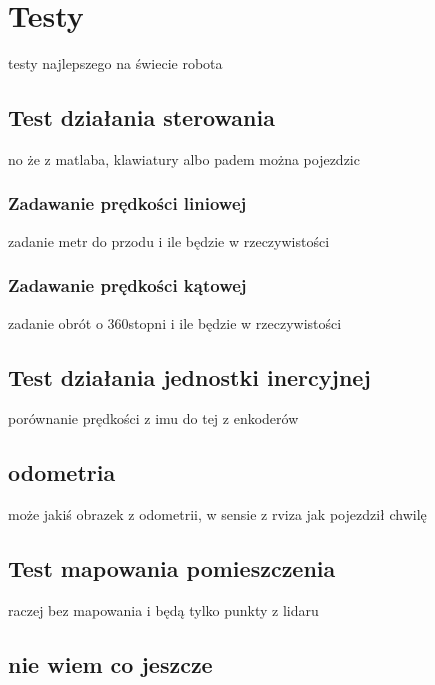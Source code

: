 \chapter{Testy}
testy najlepszego na świecie robota
\section{Test działania sterowania}
no że z matlaba, klawiatury albo padem można pojezdzic
\subsection{Zadawanie prędkości liniowej}
zadanie metr do przodu i ile będzie w rzeczywistości 
\subsection{Zadawanie prędkości kątowej}
zadanie obrót o 360stopni i ile będzie w rzeczywistości
\section{Test działania jednostki inercyjnej}
porównanie prędkości z imu do tej z enkoderów
\section{odometria}
może jakiś obrazek z odometrii, w sensie z rviza jak pojezdził chwilę
\section{Test mapowania pomieszczenia}
raczej bez mapowania i będą tylko punkty z lidaru 
\section{nie wiem co jeszcze}